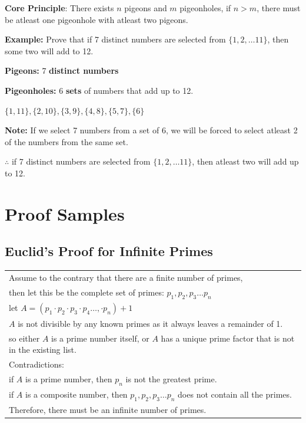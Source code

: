 \documentclass{article}
\begin{document}
\onehalfspacing

\textbf{Core Principle}: There exists $n$ pigeons and $m$ pigeonholes, if $n > m$, there must be atleast one pigeonhole with atleast two pigeons.

\textbf{Example:} Prove that if 7 distinct numbers are selected from $\{1,2, \dots 11\}$, then some two will add to 12.

\textbf{Pigeons:} 7 \textbf{distinct numbers}

\textbf{Pigeonholes:} 6 \textbf{sets} of numbers that add up to 12.

\begin{center}
$\{1,11\},\{2,10\},\{3,9\},\{4,8\},\{5,7\},\{6\}$
\end{center}

\textbf{Note:} If we select 7 numbers from a set of 6, we will be forced to select atleast 2 of the numbers from the same set.

$\therefore$ if 7 distinct numbers are selected from $\{1,2, \dots 11\}$, then atleast two will add up to 12.


\vspace{2cm}



\pagebreak{}

\text{}

\section{Proof Samples}

\hrulefill

\subsection{Euclid's Proof for Infinite Primes}

\begin{center}
  \begin{tabular}{l}
  Assume to the contrary that there are a finite number of primes,\\
  then let this be the complete set of primes: $p_1, p_2, p_3 \dots p_n$\\
  \hline
  let $A = (p_1 \cdot p_2 \cdot p_3 \cdot p_4 \dots, \cdot p_n) + 1$\\
  $A$ is not divisible by any known primes as it always leaves a remainder of 1.\\
  so either $A$ is a prime number itself, or $A$ has a unique prime factor that is not in the existing list.\\
  \hline
  Contradictions:\\
  if $A$ is a prime number, then $p_n$ is not the greatest prime.\\
  if $A$ is a composite number, then $p_1, p_2, p_3 \dots p_n$ does not contain all the primes.\\
  Therefore, there must be an infinite number of primes.\\
  \end{tabular}
\end{center}
\end{document}
